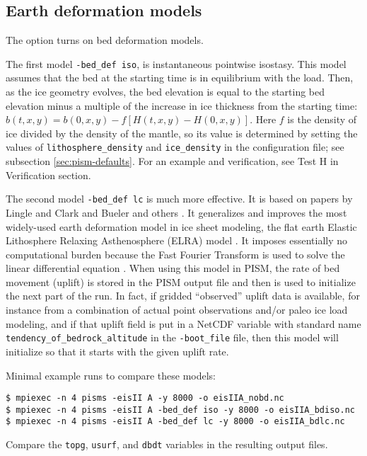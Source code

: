 \subsection{Earth deformation models} \label{subsect:beddef}  

The option  turns on bed deformation models.

The first model \texttt{-bed_def iso}, is instantaneous pointwise isostasy.  This model assumes that the bed at the starting time is in equilibrium with the load.  Then, as the ice geometry evolves, the bed elevation is equal to the starting bed elevation minus a multiple of the increase in ice thickness from the starting time: $b(t,x,y) = b(0,x,y) - f [H(t,x,y) - H(0,x,y)]$.  Here $f$ is the density of ice divided by the density of the mantle, so its value is determined by setting the values of \texttt{lithosphere_density} and \texttt{ice_density} in the configuration file; see subsection \ref{sec:pism-defaults}.  For an example and verification, see Test H in Verification section. 

The second model \texttt{-bed_def lc} is much more effective.  It is based on papers by Lingle and Clark \cite{LingleClark} and Bueler and others \cite{BLKfastearth}.  It generalizes and improves the most widely-used earth deformation model in ice sheet modeling, the flat earth Elastic Lithosphere Relaxing Asthenosphere (ELRA) model \cite{Greve2001}.  It imposes  essentially no computational burden because the Fast Fourier Transform is used to solve the linear differential equation \cite{BLKfastearth}.  When using this model in PISM, the rate of bed movement (uplift) is stored in the PISM output file and then is used to initialize the next part of the run.  In fact, if gridded ``observed'' uplift data is available, for instance from a combination of actual point observations and/or paleo ice load modeling, and if that uplift field is put in a NetCDF variable with standard name \texttt{tendency_of_bedrock_altitude} in the  \texttt{-boot_file} file, then this model will initialize so that it starts with the given uplift rate.

Minimal example runs to compare these models:
\begin{verbatim}
$ mpiexec -n 4 pisms -eisII A -y 8000 -o eisIIA_nobd.nc
$ mpiexec -n 4 pisms -eisII A -bed_def iso -y 8000 -o eisIIA_bdiso.nc
$ mpiexec -n 4 pisms -eisII A -bed_def lc -y 8000 -o eisIIA_bdlc.nc
\end{verbatim}
Compare the \texttt{topg}, \texttt{usurf}, and \texttt{dbdt} variables in the resulting output files.

